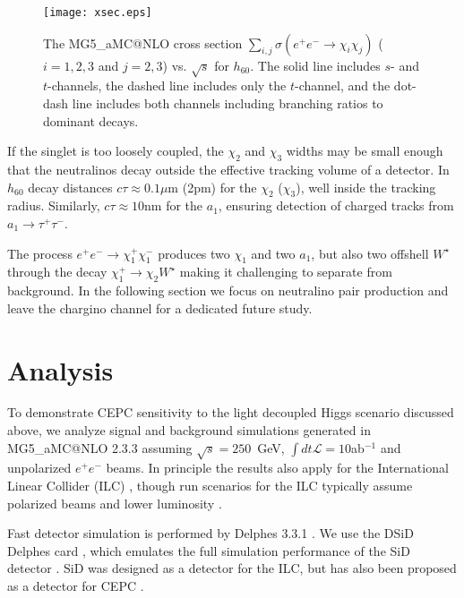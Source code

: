 \documentclass{ws-ijmpa}
\begin{document}
\begin{figure}[h]
\begin{center}
\texttt{[image: xsec.eps]}
\caption{The MG5\_aMC@NLO cross section $\sum_{i,j} \sigma(e^{+}e^{-} \rightarrow \chi_i \chi_j)$ ($i=1,2,3$ and $j=2,3$) vs. $\sqrt{s}$ for $h_{60}$. The solid line includes $s$- and $t$-channels, the dashed line includes only the $t$-channel, and the dot-dash line includes both channels including branching ratios to dominant decays.}
\label{fig:xsec}
\end{center}
\end{figure}

If the singlet is too loosely coupled, the $\chi_2$ and $\chi_3$ widths may be small enough that the neutralinos decay outside the effective tracking volume of a detector. In $h_{60}$ decay distances $c\tau \approx 0.1\mu$m (2pm) for the $\chi_2$ ($\chi_3$), well inside the tracking radius. Similarly, $c\tau\approx 10$nm for the $a_1$, ensuring detection of charged tracks from $a_1 \rightarrow \tau^+ \tau^-$.

The process $e^+ e^- \rightarrow  \chi_{1}^{+} \chi_{1}^{-}$ produces two $\chi_1$  and two $a_1$, but also two offshell $W^{\star}$  through the decay $\chi_{1}^{+} \rightarrow \chi_2 W^{\star}$ making it challenging to separate from background. In the following section we focus on neutralino pair production and leave the chargino channel for a dedicated future study.


\section{Analysis}

To demonstrate CEPC sensitivity to the light decoupled Higgs scenario discussed above, we analyze signal and background simulations generated in MG5\_aMC@NLO 2.3.3 assuming $\sqrt{s}=250$~GeV, $\int dt \mathcal{L}=10$ab$^{-1}$ and unpolarized $e^+ e^-$ beams. In principle the results also apply for the International Linear Collider (ILC) \cite{Behnke:2013lya}, though run scenarios for the ILC typically assume polarized beams and lower luminosity \cite{Barklow:2015tja}.

Fast detector simulation is performed by Delphes 3.3.1 \cite{Selvaggi:2014mya,Mertens:2015kba}. We use the DSiD Delphes card \cite{Potter:2016pgp}, which emulates the full simulation performance of the SiD detector \cite{Behnke:2013lya}. SiD was designed as a detector for the ILC, but has also been proposed as a detector for CEPC \cite{Chekanov:2016efe}. 
\end{document}
